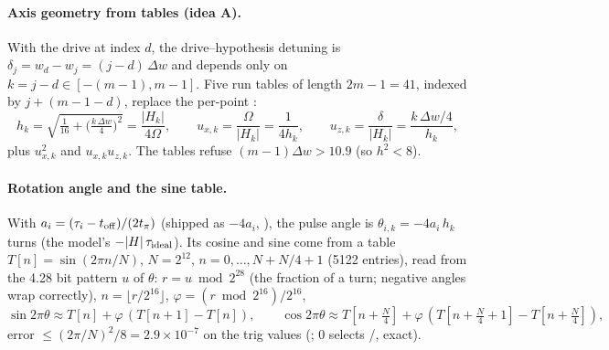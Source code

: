 \paragraph{Axis geometry from tables (idea A).} With the drive at index $d$,
the drive--hypothesis detuning is $\delta_j = w_d - w_j = (j - d)\,\Delta w$ and
depends only on $k = j - d \in [-(m-1), m-1]$. Five run tables of length
$2m - 1 = 41$, indexed by $j + (m - 1 - d)$, replace the per-point
:
\[
  h_k = \sqrt{\tfrac{1}{16} + \big(\tfrac{k\,\Delta w}{4}\big)^2} = \frac{|H_k|}{4\Omega},\qquad
  u_{x,k} = \frac{\Omega}{|H_k|} = \frac{1}{4h_k},\qquad
  u_{z,k} = \frac{\delta}{|H_k|} = \frac{k\,\Delta w/4}{h_k},
\]
plus $u_{x,k}^2$ and $u_{x,k}u_{z,k}$. The tables refuse $(m-1)\Delta w > 10.9$
(so $h^2 < 8$).

\paragraph{Rotation angle and the sine table.} With $a_i = (\tau_i -
t_{\rm off})/(2t_\pi)$ (shipped as $-4a_i$, ), the pulse
angle is $\theta_{i,k} = -4a_i\,h_k$ turns (the model's $-|H|\,\tau_{\rm ideal}$).
Its cosine and sine come from a table $T[n] = \sin(2\pi n/N)$, $N = 2^{12}$,
$n = 0, \dots, N + N/4 + 1$ (5122 entries), read from the 4.28 bit pattern
$u$ of $\theta$: $r = u \bmod 2^{28}$ (the fraction of a turn; negative angles
wrap correctly), $n = \lfloor r/2^{16}\rfloor$, $\varphi = (r \bmod 2^{16})/2^{16}$,
\[
  \sin 2\pi\theta \approx T[n] + \varphi\,(T[n+1] - T[n]),\qquad
  \cos 2\pi\theta \approx T[n + \tfrac N4] + \varphi\,(T[n + \tfrac N4 + 1] - T[n + \tfrac N4]),
\]
error $\le (2\pi/N)^2/8 = 2.9\times 10^{-7}$ on the trig values
(; 0 selects /, exact).

